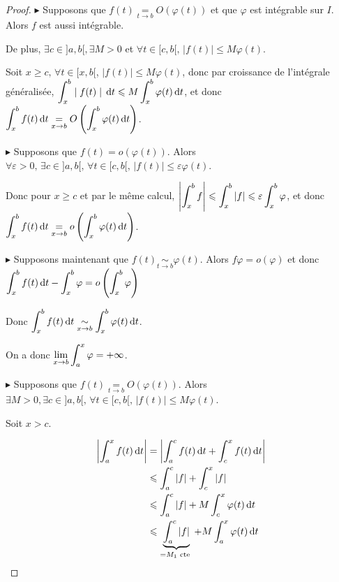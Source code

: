 \begin{proof}
    $\blacktriangleright$ Supposons que $f(t) \underset{t \to b }{=} O(\varphi(t))$ et que $\varphi$ est intégrable sur $I$. 
    Alors $f$ est aussi intégrable. 

    De plus, $\exists c \in ]a, b[, \exists M >0$ et $\forall t \in [c, b[, \, |f(t)| \leqslant M \varphi(t)$.

    Soit $x \geqslant c, \, \forall t \in [x, b[$, $|f(t)| \leqslant M \varphi(t)$, donc
    par croissance de l'intégrale généralisée, $ \displaystyle \int_{x }^{b } \mid f(t) \mid \,\mathrm{d}t \leqslant M \int_{x }^{b } \varphi(t) \,\mathrm{d}t$, et donc
    $\displaystyle \int_{x }^{b } f(t) \,\mathrm{d}t \underset{x \to b }{=} O\left( \int_{x }^{b } \varphi(t) \,\mathrm{d}t \right)$.

    $\blacktriangleright$ Supposons que $f(t) = o(\varphi(t))$. 
    Alors $\forall \varepsilon > 0, \, \exists c \in ]a, b[, \, \forall t \in [c, b[, \, |f(t)| \leqslant \varepsilon \varphi(t)$.

    Donc pour $x \geqslant c$ et par le même calcul, $\displaystyle \left| \int_{x }^{b } f \right| \leqslant \int_{x }^{b } |f| \leqslant \varepsilon \int_{x }^{b } \varphi$, 
    et donc $\displaystyle \int_{x }^{b } f(t) \,\mathrm{d}t \underset{x \to b }{=} o\left( \int_{x }^{b } \varphi(t) \,\mathrm{d}t \right)$.

    $\blacktriangleright$ Supposons maintenant que $f(t) \underset{t \to b }{\sim    } \varphi(t)$. 
    Alors $f \varphi = o(\varphi)$ et donc 
    $\displaystyle \int_{x }^{b } f(t) \,\mathrm{d}t  - \int_{x }^{b } \varphi = o \left( \int_{x }^{b } \varphi \right)$

    Donc $\displaystyle \int_{x }^{b } f(t) \,\mathrm{d}t \underset{x \to b }{\sim    } \int_{x }^{b } \varphi(t) \,\mathrm{d}t$.



    \svspace On a donc $\displaystyle \lim_{x \to b   } \int_a^x \varphi = + \infty$. 

    $\blacktriangleright$ Supposons que $f(t) \underset{t \to b }{=} O(\varphi(t))$.
    Alors $\exists M > 0, \exists c \in ]a, b[, \, \forall t \in [c, b[, \, |f(t)| \leqslant M \varphi(t)$.

    Soit $x > c$. 

    \begin{align}
        \left| \int_a^x f(t) \,\mathrm{d}t \right| & = \left| \int_a^c f(t) \,\mathrm{d}t + \int_c^x f(t) \,\mathrm{d}t \right| \\
        & \leqslant \int_a^c |f| + \int_c^x |f| \\
        & \leqslant \int_a^c |f| + M \int_c^x \varphi(t) \,\mathrm{d}t \\
        & \leqslant \underbrace{\int_a^c |f|}_{ = M_1 \text{ cte }} + M \int_a^x \varphi(t) \,\mathrm{d}t
    \end{align}


\end{proof}
